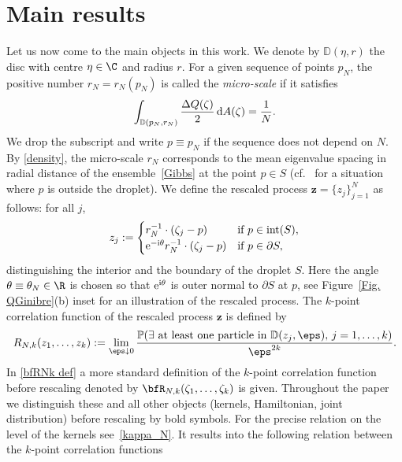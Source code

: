 \section{Main results}\label{sec:main}
Let us now come to the main objects in this work. We denote by $\mathbb{D}(\eta,r)$ the disc with centre $\eta \in \C$ and radius $r$. For a given sequence of points $p_N$, the positive number $r_N=r_N(p_N)$ is called the \textit{micro-scale} if it satisfies
\begin{gather} \label{micro-scale}
	\int_{ \mathbb{D}(p_N,r_N) } \frac{ \Delta Q(\zeta) }{2} \,{\rm d}A(\zeta)= \frac{1}{N}.
\end{gather}
We drop the subscript and write $p \equiv p_N$ if the sequence does not depend on $N$.
By \eqref{density}, the micro-scale $r_N$ corresponds to the mean eigenvalue spacing in radial distance of the ensemble~\eqref{Gibbs} at the point $p\in S$
(cf.~\cite{BE} for a situation where $p$ is outside the droplet).
We define the rescaled process $\boldsymbol{z}=\{ z_j \}_{ j=1 }^N$ as follows: for all $j$,
\begin{gather} \label{rescaling}
	z_j:=
	\begin{cases}
		r_N^{-1} \cdot (\zeta_j-p) &\text{if } p \in \operatorname{int}(S) ,
		\\
		{\rm e}^{-{\rm i}\theta} r_N^{-1} \cdot (\zeta_j-p) &\text{if } p \in \partial S ,
	\end{cases}
\end{gather}
distinguishing the interior and the boundary of the droplet $S$.
Here the angle $\theta\equiv \theta_N \in \R$ is chosen so that ${\rm e}^{{\rm i}\theta}$ is outer normal to $\partial S$ at $p$, see Figure~\ref{Fig. QGinibre}(b)
inset
for an illustration of the rescaled process.
The $k$-point correlation function of
the rescaled process $\boldsymbol{z}$ is defined by
\begin{gather*}
R_{N,k}(z_1,\dots,z_k)
:= \lim_{\eps \downarrow 0} \frac{\mathbb{P}(\exists \text{ at least one particle in } \mathbb{D}(z_j,\eps),\, j=1,\dots,k ) }{\eps^{2k}}.
\end{gather*}
In \eqref{bfRNk def} a more standard definition of the $k$-point correlation function before rescaling denoted by $\bfR_{N,k}(\zeta_1,\dots,\zeta_k)$ is given.
Throughout the paper we distinguish these and all other objects (kernels, Hamiltonian, joint distribution) before rescaling by bold symbols.
For the precise relation on the level of the kernels see~\eqref{kappa_N}. It results into the following relation between the $k$-point correlation functions
